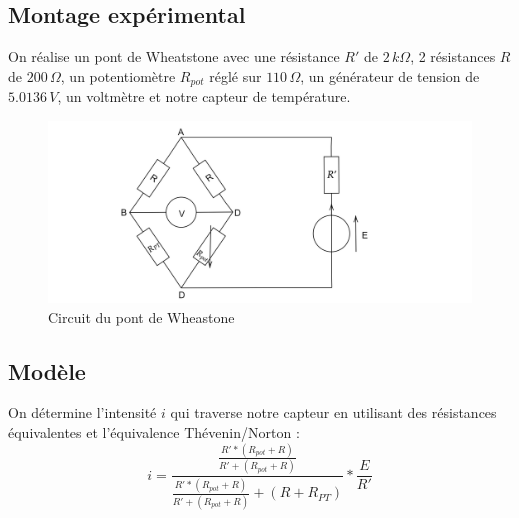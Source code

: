 \documentclass[12pt]{article}
\begin{document}
\subsection{Montage expérimental}

On réalise un pont de Wheatstone avec une résistance $R'$ de $2\, k\Omega$, 2 résistances $R$ de $200\,\Omega$, un potentiomètre $R_{pot}$ réglé sur $110\, \Omega$, un générateur de tension de $5.0136\, V$, un voltmètre et notre capteur de température. 

\begin{figure}[h!]
	\begin{center}
		\includegraphics[scale=0.2]{Wheatstone.png}
		\caption{Circuit du pont de Wheastone}
		\label{Wheatstone}
	\end{center}
\end{figure}

\subsection{Modèle}

On détermine l'intensité $i$ qui traverse notre capteur en utilisant des résistances équivalentes et l'équivalence Thévenin/Norton :
\begin{equation}
i=\frac{\frac{R'*(R_{pot}+R)}{R'+(R_{pot}+R)}}{\frac{R'*(R_{pot}+R)}{R'+(R_{pot}+R)}+(R+R_{PT})}*\frac{E}{R'}
\label{Intensité_wheatstone}
\end{equation}
\end{document}
